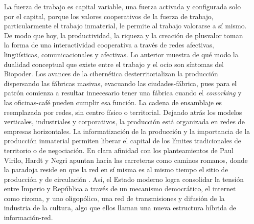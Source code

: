 La fuerza de trabajo es capital variable, una fuerza activada y configurada solo por el capital, porque los valores cooperativos de la fuerza de trabajo, particularmente el trabajo inmaterial, le permite al trabajo valorarse a sí mismo. De modo que hoy, la productividad, la riqueza y la creación de plusvalor toman la forma de una interactividad cooperativa a través de redes afectivas, lingüísticas, comunicacionales y afectivas. Lo anterior muestra de qué modo la dualidad conceptual que existe entre el trabajo y el ocio son síntomas del Biopoder. Los avances de la cibernética desterritorializan la producción dispersando las fábricas masivas, evacuando las ciudades-fábrica, pues para el patrón comienza a resultar innecesario tener una fábrica cuando el \emph{coworking} y las oficinas-café pueden cumplir esa función. La cadena de ensamblaje es reemplazada por redes, sin centro físico o territorial. Dejando atrás los modelos verticales, industriales y corporativos, la producción está organizada en redes de empresas horizontales. La informatización de la producción y la importancia de la producción inmaterial permiten liberar el capital de los límites tradicionales de territorio o de negociación. En clara afinidad con los planteamientos de Paul Virilo, Hardt y Negri apuntan hacia las carreteras como caminos romanos, donde la paradoja reside en que la red en sí misma es al mismo tiempo el sitio de producción y de circulación \autocite{hardtImperio2005}. Así, el Estado moderno logra consolidar la tensión entre Imperio y República a través de un mecanismo democrático, el internet como rizoma, y uno oligopólico, una red de transmisiones y difusión de la industria de la cultura, algo que ellos llaman una nueva estructura híbrida de información-red.

